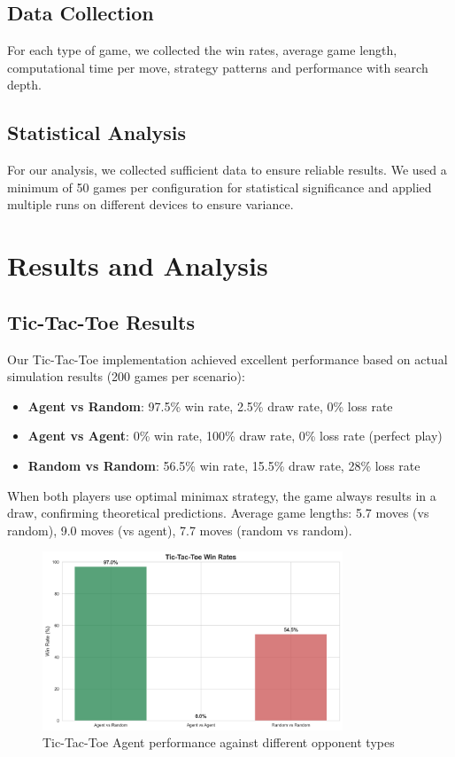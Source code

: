 \documentclass[12pt]{article}
\begin{document}
\subsection{Data Collection}

For each type of game, we collected the win rates, average game length, computational time per move, strategy patterns and performance with search depth.

\subsection{Statistical Analysis}

For our analysis, we collected sufficient data to ensure reliable results. We used a minimum of 50 games per configuration for statistical significance and applied multiple runs on different devices to ensure variance. 

\section{Results and Analysis}

\subsection{Tic-Tac-Toe Results}

Our Tic-Tac-Toe implementation achieved excellent performance based on actual simulation results (200 games per scenario):
\begin{itemize}
    \item \textbf{Agent vs Random}: 97.5\% win rate, 2.5\% draw rate, 0\% loss rate
    \item \textbf{Agent vs Agent}: 0\% win rate, 100\% draw rate, 0\% loss rate (perfect play)
    \item \textbf{Random vs Random}: 56.5\% win rate, 15.5\% draw rate, 28\% loss rate
\end{itemize}
When both players use optimal minimax strategy, the game always results in a draw, confirming theoretical predictions. Average game lengths: 5.7 moves (vs random), 9.0 moves (vs agent), 7.7 moves (random vs random).

\begin{figure}[H]
\centering
\includegraphics[width=0.8\textwidth]{output/images/tic_tac_toe_win_rates.png}
\caption{Tic-Tac-Toe Agent performance against different opponent types}
\label{fig:ttt_win_rates}
\end{figure}
\end{document}
